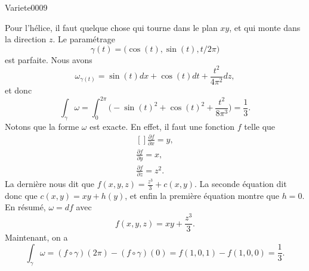 
\begin{corrige}{Variete0009}

	Pour l'hélice, il faut quelque chose qui tourne dans le plan $xy$, et qui monte dans la direction $z$. Le paramétrage
	\begin{equation}
		\gamma(t)=\big( \cos(t),\sin(t),t/2\pi \big)
	\end{equation}
	est parfaite. Nous avons
	\begin{equation}
		\omega_{\gamma(t)}=\sin(t)dx+\cos(t)dt+\frac{ t^2 }{ 4\pi^2 }dz,
	\end{equation}
	et donc
	\begin{equation}
		\int_{\gamma}\omega=\int_0^{2\pi}\big( -\sin(t)^2+\cos(t)^2+\frac{ t^2 }{ 8\pi^3 } \big)=\frac{ 1 }{ 3 }.
	\end{equation}
	Notons que la forme $\omega$ est exacte. En effet, il faut une fonction $f$ telle que
	\begin{equation}
		\begin{aligned}[]
			\frac{ \partial f }{ \partial x }=y,\\
			\frac{ \partial f }{ \partial y }=x,\\
			\frac{ \partial f }{ \partial z }=z^2.
		\end{aligned}
	\end{equation}
	La dernière nous dit que $f(x,y,z)=\frac{ z^3 }{ 3 }+c(x,y)$. La seconde équation dit donc que $c(x,y)=xy+h(y)$, et enfin la première équation montre que $h=0$. En résumé, $\omega=df$ avec
	\begin{equation}
		f(x,y,z)=xy+\frac{ z^3 }{ 3 }.
	\end{equation}
	Maintenant, on a
	\begin{equation}
		\int_{\gamma}\omega=(f\circ\gamma)(2\pi)-(f\circ\gamma)(0)=f(1,0,1)-f(1,0,0)=\frac{1}{ 3 }.
	\end{equation}
	

\end{corrige}

